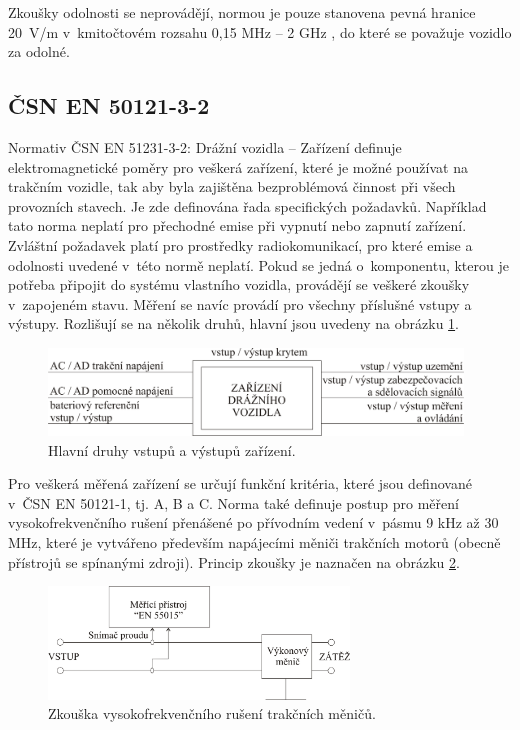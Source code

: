 Zkoušky odolnosti se neprovádějí, normou je pouze stanovena pevná hranice 20~V/m v~kmitočtovém rozsahu 0,15 MHz – 2 GHz , do které se považuje vozidlo za odolné.

\subsection{ČSN EN 50121-3-2}
Normativ ČSN EN 51231-3-2: Drážní vozidla – Zařízení definuje elektromagnetické poměry pro veškerá zařízení, které je možné používat na trakčním vozidle, tak aby byla zajištěna bezproblémová činnost při všech provozních stavech. Je zde definována řada specifických požadavků. Například tato norma neplatí pro přechodné emise při vypnutí nebo zapnutí zařízení. Zvláštní požadavek platí pro prostředky radiokomunikací, pro které emise a odolnosti uvedené v~této normě neplatí. Pokud se jedná o~komponentu, kterou je potřeba připojit do systému vlastního vozidla, provádějí se veškeré zkoušky v~zapojeném stavu. Měření se navíc provádí pro všechny příslušné vstupy a výstupy. 
Rozlišují se na několik druhů, hlavní jsou uvedeny na obrázku \ref{obr:emc_IO}.

\begin{figure}[!h]
	\centering
	\includegraphics[width=11cm]{emc_IO.png}
	\caption{Hlavní druhy vstupů a výstupů zařízení. \cite{csn}}
	\label{obr:emc_IO}
\end{figure}

Pro veškerá měřená zařízení se určují funkční kritéria, které jsou definované v~ČSN EN 50121-1, tj. A, B a C. Norma také definuje postup pro měření vysokofrekvenčního rušení přenášené po přívodním vedení v~pásmu 9 kHz až 30 MHz, které je vytvářeno především napájecími měniči trakčních motorů (obecně přístrojů se spínanými zdroji). Princip zkoušky je naznačen na obrázku \ref{obr:emc_vf}. 

\begin{figure}[!h]
	\centering
	\includegraphics[width=8cm]{emc_vf.png}
	\caption{Zkouška vysokofrekvenčního rušení trakčních měničů.\cite{csn}}
	\label{obr:emc_vf}
\end{figure}

